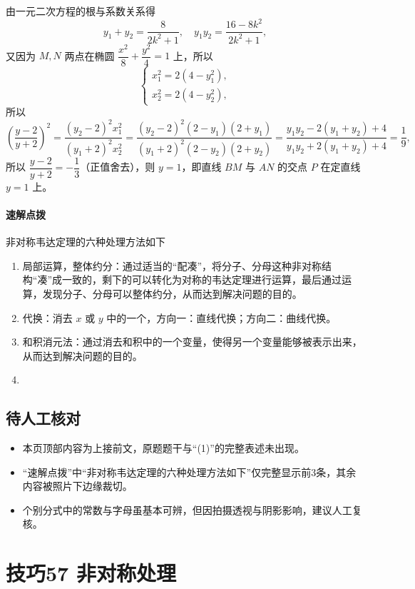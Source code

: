 \documentclass[UTF8,a4paper,11pt]{ctexart}
\begin{document}
由一元二次方程的根与系数关系得
\[
y_1+y_2=\frac{8}{2k^2+1},\quad y_1y_2=\frac{16-8k^2}{2k^2+1},
\]
又因为 $M,N$ 两点在椭圆 $\dfrac{x^2}{8}+\dfrac{y^2}{4}=1$ 上，所以
\[
\begin{cases}
x_1^2=2(4-y_1^2),\\
x_2^2=2(4-y_2^2),
\end{cases}
\]
所以
\[
\left(\frac{y-2}{y+2}\right)^2=\frac{(y_2-2)^2x_1^2}{(y_1+2)^2x_2^2}=\frac{(y_2-2)^2(2-y_1)(2+y_1)}{(y_1+2)^2(2-y_2)(2+y_2)}=\frac{y_1y_2-2(y_1+y_2)+4}{y_1y_2+2(y_1+y_2)+4}=\frac{1}{9},
\]
所以 $\dfrac{y-2}{y+2}=-\dfrac{1}{3}$（正值舍去），则 $y=1$，即直线 $BM$ 与 $AN$ 的交点 $P$ 在定直线 $y=1$ 上。

\paragraph{速解点拨}非对称韦达定理的六种处理方法如下
\begin{enumerate}
\item 局部运算，整体约分：通过适当的“配凑”，将分子、分母这种非对称结构“凑”成一致的，剩下的可以转化为对称的韦达定理进行运算，最后通过运算，发现分子、分母可以整体约分，从而达到解决问题的目的。
\item 代换：消去 $x$ 或 $y$ 中的一个，方向一：直线代换；方向二：曲线代换。
\item 和积消元法：通过消去和积中的一个变量，使得另一个变量能够被表示出来，从而达到解决问题的目的。
\item [待人工核对]
\end{enumerate}

\subsection*{待人工核对}

\begin{itemize}

\item 本页顶部内容为上接前文，原题题干与“(1)”的完整表述未出现。

\item “速解点拨”中“非对称韦达定理的六种处理方法如下”仅完整显示前3条，其余内容被照片下边缘裁切。

\item 个别分式中的常数与字母虽基本可辨，但因拍摄透视与阴影影响，建议人工复核。

\end{itemize}

\clearpage

\section{技巧57 非对称处理}
\end{document}
